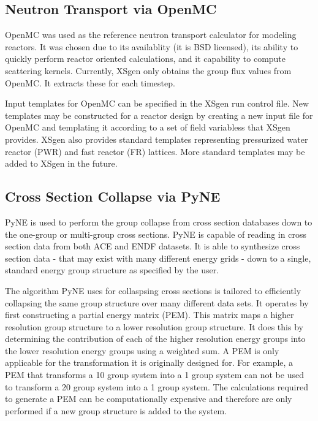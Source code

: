 \documentclass{article}
\begin{document}
\subsection{Neutron Transport via OpenMC}

OpenMC was used as the reference neutron transport calculator for modeling reactors.
It was chosen due to its availablity (it is BSD licensed), its ability to quickly perform
reactor oriented calculations\cite{serpentvmonte}, and it capability to compute scattering
kernels. Currently, XSgen only obtains the group flux values from OpenMC. It extracts
these for each timestep.

Input templates for OpenMC can be specified in the XSgen run control file.
New templates may be constructed for a reactor design by creating a new input file for OpenMC
and templating it according to a set of field variabless that XSgen provides.
XSgen also provides standard templates representing pressurized water reactor (PWR)
and fast reactor (FR) lattices. More standard templates may be added to XSgen in the future.

\subsection{Cross Section Collapse via PyNE}

PyNE is used to perform the group collapse
from cross section databases down to the one-group or multi-group cross sections.
PyNE is capable of reading in cross section data from both ACE\cite{ace} and ENDF\cite{endf}
datasets. It is able to synthesize cross section data - that may exist with
many different energy grids - down to a single, standard energy group structure as specified
by the user.

The algorithm PyNE uses for collaspsing cross sections is tailored to efficiently collapsing
the same group structure over many different data sets.
It operates by first constructing a partial energy matrix (PEM). This matrix maps a higher
resolution group structure to a lower resolution group structure. It does this by determining
the contribution of each of the higher resolution energy groups into the lower resolution
energy groups using a weighted sum. A PEM is only applicable for the transformation it is
originally designed for. For example, a PEM that transforms a 10 group system into a
1 group system can not be used to transform a 20 group system into a 1 group system.
The calculations required to generate a PEM can be computationally expensive
and therefore are only performed if a new group structure is added to the system.
\end{document}
